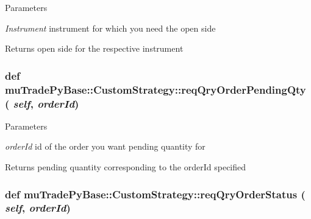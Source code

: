 \begin{DoxyParams}{Parameters}
\item[{\em Instrument}]instrument for which you need the open side \end{DoxyParams}
\begin{DoxyReturn}{Returns}
open side for the respective instrument 
\end{DoxyReturn}
\hypertarget{classmuTradePyBase_1_1CustomStrategy_a1b353f46dffc755667c896b669a638fa}{
\subsubsection[{reqQryOrderPendingQty}]{\setlength{\rightskip}{0pt plus 5cm}def muTradePyBase::CustomStrategy::reqQryOrderPendingQty ( {\em self}, \/   {\em orderId})}}
\label{classmuTradePyBase_1_1CustomStrategy_a1b353f46dffc755667c896b669a638fa}

\begin{DoxyParams}{Parameters}
\item[{\em orderId}]id of the order you want pending quantity for \end{DoxyParams}
\begin{DoxyReturn}{Returns}
pending quantity corresponding to the orderId specified 
\end{DoxyReturn}
\hypertarget{classmuTradePyBase_1_1CustomStrategy_a0127eda99cf09acb990a26ccc63ac617}{
\subsubsection[{reqQryOrderStatus}]{\setlength{\rightskip}{0pt plus 5cm}def muTradePyBase::CustomStrategy::reqQryOrderStatus ( {\em self}, \/   {\em orderId})}}
\label{classmuTradePyBase_1_1CustomStrategy_a0127eda99cf09acb990a26ccc63ac617}

